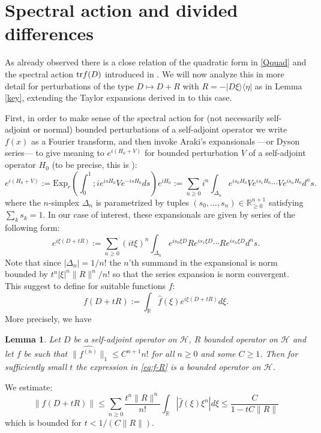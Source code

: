 \documentclass{amsart}
\newtheorem{lem}[thm]{Lemma}
\def\tr{{\rm Tr}}
\def\R{{\mathbb R}}
\def\tr{{\rm tr}}
\def\cH{{\mathcal H}}
\def\tr{{\rm tr}}
\def\R{{\mathbb R}}
\def\tr{{\rm tr}}
\def\cH{{\mathcal H}}
\begin{document}
 \section{Spectral action and divided differences}
 \label{sect:sa}

 As already observed there is a close relation of the quadratic form in \eqref{Qquad} and the spectral action $\tr f(D)$ introduced in \cite{CC96}. We will now analyze this in more detail for perturbations of the type  $D \mapsto D +R$ with $R = - | D \xi \rangle \langle \eta|$ as in Lemma \ref{key}, extending the Taylor expansions derived in \cite{Han06,Sui11,Skr13,NSkr21,NS21} to this case.

First, in order to make sense of the spectral action for (not necessarily self-adjoint or normal) bounded perturbations of a self-adjoint operator we write $f (x)$ as a Fourier transform, and then invoke Araki's expansionals \cite{araki} ---or Dyson series--- to give meaning to $e^{i (H_0+ V)}$ for bounded perturbation $V$ of a self-adjoint operator $H_0$ (to be precise, this is \cite[Eq. 5.16]{araki}):
\begin{equation}
e^{i (H_0 +V)}:=
\mathrm{Exp}_r \left(\int_0^1 ; i  e^{i s H_0}   V e^{-i s H_0} ds \right) e^{i H_0} := \sum_{n \geq 0} i^n \int_{\Delta_n} e^{i s_0 H_0} V e^{i s_1 H_0} \cdots V e^{i s_n H_0}  d^n s.
\label{eq:expans}
\end{equation}
where the $n$-simplex $\Delta_n$ is parametrized by tuples $(s_0,\ldots, s_n) \in \R^{n+1}_{\geq 0}$ satisfying $\sum_k s_k = 1$. In our case of interest, these expansionals are given by series of the following form:
\begin{equation}
e^{i \xi (D +t R)}
:= \sum_{n \geq 0} (it \xi)^n \int_{\Delta_n} e^{i s_0\xi D} R e^{i s_1 \xi D} \cdots R e^{i s_n \xi D}  d^n s.
\label{eq:expans}
\end{equation}
Note that since $|\Delta_n | = 1/n!$ the $n$'th summand in the expansional is norm bounded by $t^n|\xi|^n  \| R\|^n/n!$ so that the series expansion is norm convergent. This suggest to define for suitable functions $f$: 
\begin{equation}
  f( D+ t R) := \int_\R \widehat f(\xi) e^{i \xi (D+t R)} d\xi %
.
  \label{eq:f-R}
\end{equation}
More precisely, we have 
\begin{lem}
  Let $D$ be a self-adjoint operator on $\cH$, $R$ bounded operator on $\cH$ and let $f$ be such that $\| \widehat{f^{(n)}}\|_1 \leq C^{n+1} n!$ for all $n \geq 0$ and some $C\geq 1$. Then for sufficiently small $t$ the expression in \eqref{eq:f-R} is a bounded operator on $\cH$.
\end{lem}
\proof
We estimate:
$$
\|  f( D+ t R) \| \leq \sum_{n \geq 0} \frac{t^n \| R\| ^n}{n!} \int_\R | \widehat f(\xi)  \xi^n | d \xi \leq \frac{C}{1- t C \| R\|}
$$
which is bounded for $t < 1/ (C \| R\|)$.
\endproof
\end{document}
